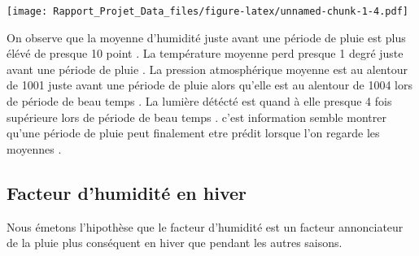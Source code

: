\documentclass[
]{article}
\begin{document}
\texttt{[image: Rapport\_Projet\_Data\_files/figure-latex/unnamed-chunk-1-4.pdf]}

On observe que la moyenne d'humidité juste avant une période de pluie
est plus élévé de presque 10 point . La température moyenne perd presque
1 degré juste avant une période de pluie . La pression atmosphérique
moyenne est au alentour de 1001 juste avant une période de pluie alors
qu'elle est au alentour de 1004 lors de période de beau temps . La
lumière détécté est quand à elle presque 4 fois supérieure lors de
période de beau temps . c'est information semble montrer qu'une période
de pluie peut finalement etre prédit lorsque l'on regarde les moyennes .

\hypertarget{facteur-dhumidituxe9-en-hiver}{%
\subsection{Facteur d'humidité en
hiver}\label{facteur-dhumidituxe9-en-hiver}}

Nous émetons l'hipothèse que le facteur d'humidité est un facteur
annonciateur de la pluie plus conséquent en hiver que pendant les autres
saisons.
\end{document}
